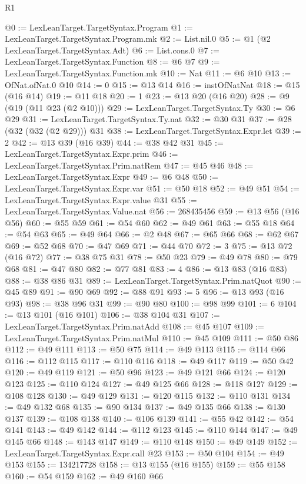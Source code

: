 \begin{lexlean}{R1}
\begin{coremodule}
@0 := LexLeanTarget.TargetSyntax.Program
@1 := LexLeanTarget.TargetSyntax.Program.mk
@2 := List.nil.{0}
@5 := @1 (@2 LexLeanTarget.TargetSyntax.Adt)
@6 := List.cons.{0}
@7 := LexLeanTarget.TargetSyntax.Function
@8 := @6 @7
@9 := LexLeanTarget.TargetSyntax.Function.mk
@10 := Nat
@11 := @6 @10
@13 := OfNat.ofNat.{0} @10
@14 := 0
@15 := @13 @14
@16 := instOfNatNat
@18 := @15 (@16 @14)
@19 := @11 @18
@20 := 1
@23 := @13 @20 (@16 @20)
@28 := @9 (@19 (@11 @23 (@2 @10)))
@29 := LexLeanTarget.TargetSyntax.Ty
@30 := @6 @29
@31 := LexLeanTarget.TargetSyntax.Ty.nat
@32 := @30 @31
@37 := @28 (@32 (@32 (@2 @29))) @31
@38 := LexLeanTarget.TargetSyntax.Expr.let
@39 := 2
@42 := @13 @39 (@16 @39)
@44 := @38 @42 @31
@45 := LexLeanTarget.TargetSyntax.Expr.prim
@46 := LexLeanTarget.TargetSyntax.Prim.natRem
@47 := @45 @46
@48 := LexLeanTarget.TargetSyntax.Expr
@49 := @6 @48
@50 := LexLeanTarget.TargetSyntax.Expr.var
@51 := @50 @18
@52 := @49 @51
@54 := LexLeanTarget.TargetSyntax.Expr.value @31
@55 := LexLeanTarget.TargetSyntax.Value.nat
@56 := 268435456
@59 := @13 @56 (@16 @56)
@60 := @55 @59
@61 := @54 @60
@62 := @49 @61
@63 := @55 @18
@64 := @54 @63
@65 := @49 @64
@66 := @2 @48
@67 := @65 @66
@68 := @62 @67
@69 := @52 @68
@70 := @47 @69
@71 := @44 @70
@72 := 3
@75 := @13 @72 (@16 @72)
@77 := @38 @75 @31
@78 := @50 @23
@79 := @49 @78
@80 := @79 @68
@81 := @47 @80
@82 := @77 @81
@83 := 4
@86 := @13 @83 (@16 @83)
@88 := @38 @86 @31
@89 := LexLeanTarget.TargetSyntax.Prim.natQuot
@90 := @45 @89
@91 := @90 @69
@92 := @88 @91
@93 := 5
@96 := @13 @93 (@16 @93)
@98 := @38 @96 @31
@99 := @90 @80
@100 := @98 @99
@101 := 6
@104 := @13 @101 (@16 @101)
@106 := @38 @104 @31
@107 := LexLeanTarget.TargetSyntax.Prim.natAdd
@108 := @45 @107
@109 := LexLeanTarget.TargetSyntax.Prim.natMul
@110 := @45 @109
@111 := @50 @86
@112 := @49 @111
@113 := @50 @75
@114 := @49 @113
@115 := @114 @66
@116 := @112 @115
@117 := @110 @116
@118 := @49 @117
@119 := @50 @42
@120 := @49 @119
@121 := @50 @96
@123 := @49 @121 @66
@124 := @120 @123
@125 := @110 @124
@127 := @49 @125 @66
@128 := @118 @127
@129 := @108 @128
@130 := @49 @129
@131 := @120 @115
@132 := @110 @131
@134 := @49 @132 @68
@135 := @90 @134
@137 := @49 @135 @66
@138 := @130 @137
@139 := @108 @138
@140 := @106 @139
@141 := @55 @42
@142 := @54 @141
@143 := @49 @142
@144 := @112 @123
@145 := @110 @144
@147 := @49 @145 @66
@148 := @143 @147
@149 := @110 @148
@150 := @49 @149
@152 := LexLeanTarget.TargetSyntax.Expr.call @23
@153 := @50 @104
@154 := @49 @153
@155 := 134217728
@158 := @13 @155 (@16 @155)
@159 := @55 @158
@160 := @54 @159
@162 := @49 @160 @66

\end{coremodule}
\end{lexlean}
